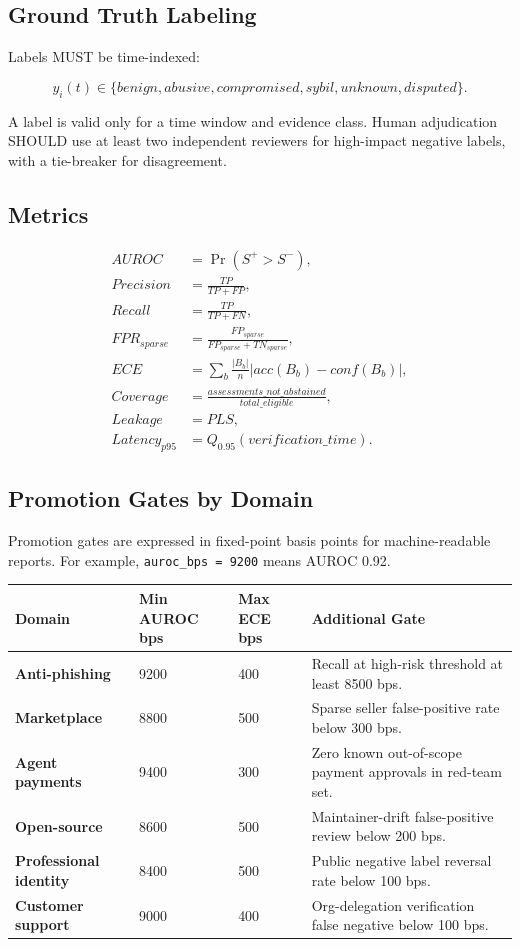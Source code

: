 \documentclass[11pt]{article}
\begin{document}
\subsection{Ground Truth Labeling}

Labels MUST be time-indexed:

\begin{equation}
y_i(t)\in\{benign,abusive,compromised,sybil,unknown,disputed\}.
\end{equation}

A label is valid only for a time window and evidence class. Human adjudication SHOULD use at least two independent reviewers for high-impact negative labels, with a tie-breaker for disagreement.

\subsection{Metrics}

\begin{align}
AUROC&=\Pr(S^+>S^-),\\
Precision&=\frac{TP}{TP+FP},\\
Recall&=\frac{TP}{TP+FN},\\
FPR_{sparse}&=\frac{FP_{sparse}}{FP_{sparse}+TN_{sparse}},\\
ECE&=\sum_b\frac{|B_b|}{n}|acc(B_b)-conf(B_b)|,\\
Coverage&=\frac{assessments\_not\_abstained}{total\_eligible},\\
Leakage&=PLS,\\
Latency_{p95}&=Q_{0.95}(verification\_time).
\end{align}

\subsection{Promotion Gates by Domain}

Promotion gates are expressed in fixed-point basis points for machine-readable reports. For example, \texttt{auroc\_bps = 9200} means AUROC 0.92.

\begin{center}
\begin{tabularx}{\textwidth}{>{\bfseries}p{} p{} p{} X}
\toprule
Domain & Min AUROC bps & Max ECE bps & Additional Gate \\
\midrule
Anti-phishing & 9200 & 400 & Recall at high-risk threshold at least 8500 bps. \\
Marketplace & 8800 & 500 & Sparse seller false-positive rate below 300 bps. \\
Agent payments & 9400 & 300 & Zero known out-of-scope payment approvals in red-team set. \\
Open-source & 8600 & 500 & Maintainer-drift false-positive review below 200 bps. \\
Professional identity & 8400 & 500 & Public negative label reversal rate below 100 bps. \\
Customer support & 9000 & 400 & Org-delegation verification false negative below 100 bps. \\
\bottomrule
\end{tabularx}
\end{center}
\end{document}
